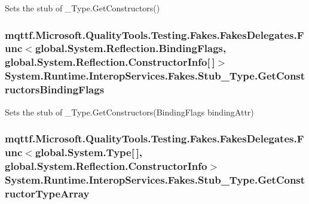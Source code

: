 Sets the stub of \-\_\-\-Type.\-Get\-Constructors()

\hypertarget{class_system_1_1_runtime_1_1_interop_services_1_1_fakes_1_1_stub___type_a057eeb3d4869c667ab2a0442ed2a4dcf}{
\subsubsection[{Get\-Constructors\-Binding\-Flags}]{\setlength{\rightskip}{0pt plus 5cm}mqttf.\-Microsoft.\-Quality\-Tools.\-Testing.\-Fakes.\-Fakes\-Delegates.\-Func$<$global.\-System.\-Reflection.\-Binding\-Flags, global.\-System.\-Reflection.\-Constructor\-Info\mbox{[}$\,$\mbox{]}$>$ System.\-Runtime.\-Interop\-Services.\-Fakes.\-Stub\-\_\-\-Type.\-Get\-Constructors\-Binding\-Flags}}\label{class_system_1_1_runtime_1_1_interop_services_1_1_fakes_1_1_stub___type_a057eeb3d4869c667ab2a0442ed2a4dcf}


Sets the stub of \-\_\-\-Type.\-Get\-Constructors(\-Binding\-Flags binding\-Attr)

\hypertarget{class_system_1_1_runtime_1_1_interop_services_1_1_fakes_1_1_stub___type_a14e4bfe2a006bef9d63f94e62b97d867}{
\subsubsection[{Get\-Constructor\-Type\-Array}]{\setlength{\rightskip}{0pt plus 5cm}mqttf.\-Microsoft.\-Quality\-Tools.\-Testing.\-Fakes.\-Fakes\-Delegates.\-Func$<$global.\-System.\-Type\mbox{[}$\,$\mbox{]}, global.\-System.\-Reflection.\-Constructor\-Info$>$ System.\-Runtime.\-Interop\-Services.\-Fakes.\-Stub\-\_\-\-Type.\-Get\-Constructor\-Type\-Array}}\label{class_system_1_1_runtime_1_1_interop_services_1_1_fakes_1_1_stub___type_a14e4bfe2a006bef9d63f94e62b97d867}


